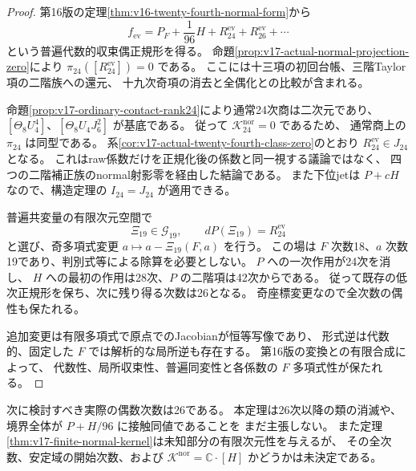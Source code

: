 \begin{proof}
第16版の定理\ref{thm:v16-twenty-fourth-normal-form}から
\[
 f_{\mathrm{ev}}=P_F+\frac1{96}H+R_{24}^{\mathrm{ev}}
                                      +R_{26}^{\mathrm{ev}}+\cdots
\]
という普遍代数的収束偶正規形を得る。
命題\ref{prop:v17-actual-normal-projection-zero}により
$\pi_{24}([R_{24}^{\mathrm{ev}}])=0$ である。
ここには十三項の初回台帳、三階Taylor項の二階族への還元、
十九次奇項の消去と全偶化との比較が含まれる。

命題\ref{prop:v17-ordinary-contact-rank24}により通常24次商は二次元であり、
$[\Theta_8U_4^4]$、$[\Theta_8U_4J_6^2]$ が基底である。
従って $\mathcal K_{24}^{\mathrm{nor}}=0$ であるため、
通常商上の $\pi_{24}$ は同型である。
系\ref{cor:v17-actual-twenty-fourth-class-zero}のとおり
$R_{24}^{\mathrm{ev}}\in J_{24}$ となる。
これはraw係数だけを正規化後の係数と同一視する議論ではなく、
四つの二階補正族のnormal射影零を経由した結論である。
また下位jetは $P+cH$ なので、構造定理の $I_{24}=J_{24}$ が適用できる。

普遍共変量の有限次元空間で
\[
 \Xi_{19}\in\mathcal G_{19},\qquad dP(\Xi_{19})=R_{24}^{\mathrm{ev}}
\]
と選び、奇多項式変更 $a\mapsto a-\Xi_{19}(F,a)$ を行う。
この場は $F$ 次数18、$a$ 次数19であり、判別式等による除算を必要としない。
$P$ への一次作用が24次を消し、
$H$ への最初の作用は28次、$P$ の二階項は42次からである。
従って既存の低次正規形を保ち、次に残り得る次数は26となる。
奇座標変更なので全次数の偶性も保たれる。

追加変更は有限多項式で原点でのJacobianが恒等写像であり、
形式逆は代数的、固定した $F$ では解析的な局所逆も存在する。
第16版の変換との有限合成によって、
代数性、局所収束性、普遍同変性と各係数の $F$ 多項式性が保たれる。
\end{proof}

\begin{remark}[次に残る次数と全Hessian形]
次に検討すべき実際の偶数次数は26である。
本定理は26次以降の類の消滅や、境界全体が $P+H/96$ に接触同値であることを
まだ主張しない。
また定理\ref{thm:v17-finite-normal-kernel}は未知部分の有限次元性を与えるが、
その全次数、安定域の開始次数、および
$\mathcal K^{\mathrm{nor}}=\mathbb C\cdot[H]$ かどうかは未決定である。
\end{remark}


\clearpage

